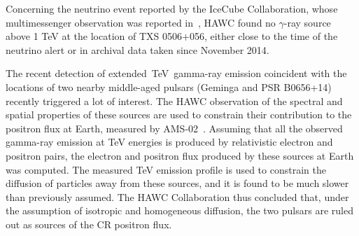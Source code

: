 \documentclass{PoS}
\begin{document}
\begin{itemize}
Concerning the neutrino event reported by the IceCube Collaboration, whose multimessenger observation was reported in~\cite{IceCube:2018cha}, HAWC found no $\gamma$-ray source above 1 TeV at the location of TXS 0506+056, either close to the time of the neutrino alert or in archival data taken since November 2014.

The recent detection of extended~TeV~gamma-ray emission coincident with the 
locations of two nearby middle-aged pulsars (Geminga and PSR 
B0656+14)~\cite{HAWCpositrons} recently triggered a lot of interest. The HAWC observation of the spectral and spatial properties of these sources are used
to constrain their contribution to the positron flux at Earth, measured by AMS-02~\cite{positrons}. Assuming that all the observed gamma-ray emission at TeV energies is
produced by relativistic electron and positron pairs, the electron and positron
flux produced by these sources at Earth was computed. The measured TeV emission profile is used to constrain the diffusion of particles away from these
sources, and it is found to be much slower than previously assumed. The HAWC Collaboration thus concluded that, under the assumption of isotropic and homogeneous diffusion, the two pulsars are ruled out as sources of the CR positron flux.








\end{itemize}
\end{document}
